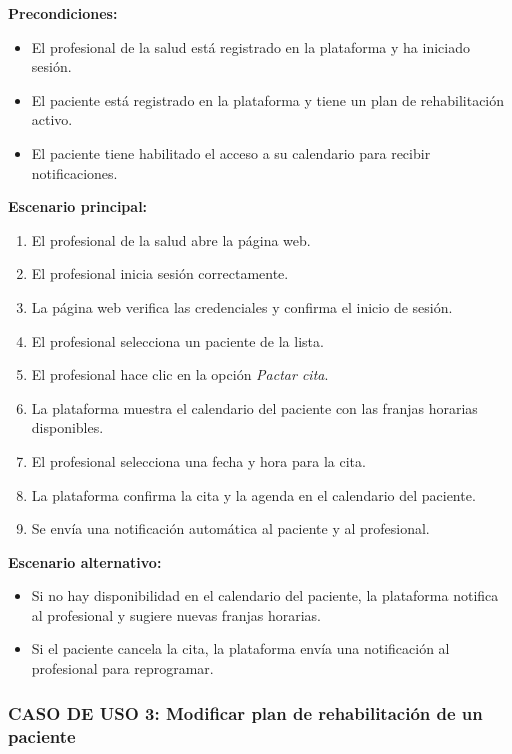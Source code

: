 \documentclass{article}
\begin{document}
\textbf{Precondiciones:}
\begin{itemize}
	\item El profesional de la salud está registrado en la plataforma y ha iniciado sesión.
	\item El paciente está registrado en la plataforma y tiene un plan de rehabilitación activo.
	\item El paciente tiene habilitado el acceso a su calendario para recibir notificaciones.
\end{itemize}

\textbf{Escenario principal:}
\begin{enumerate}
	\item El profesional de la salud abre la página web.
	\item El profesional inicia sesión correctamente.
	\item La página web verifica las credenciales y confirma el inicio de sesión.
	\item El profesional selecciona un paciente de la lista.
	\item El profesional hace clic en la opción \textit{Pactar cita}.
	\item La plataforma muestra el calendario del paciente con las franjas horarias disponibles.
	\item El profesional selecciona una fecha y hora para la cita.
	\item La plataforma confirma la cita y la agenda en el calendario del paciente.
	\item Se envía una notificación automática al paciente y al profesional.
\end{enumerate}

\textbf{Escenario alternativo:}
\begin{itemize}
	\item Si no hay disponibilidad en el calendario del paciente, la plataforma notifica al profesional y sugiere nuevas franjas horarias.
	\item Si el paciente cancela la cita, la plataforma envía una notificación al profesional para reprogramar.
\end{itemize}

\subsubsection*{CASO DE USO 3: Modificar plan de rehabilitación de un paciente}
\end{document}
